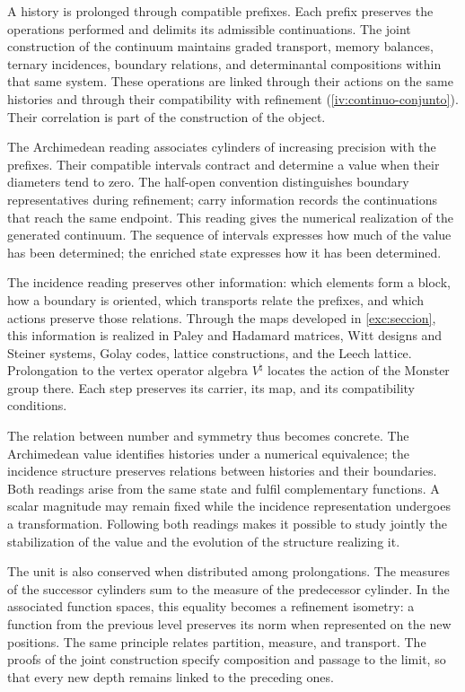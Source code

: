 A history is prolonged through compatible prefixes. Each prefix
preserves the operations performed and delimits its admissible
continuations. The joint construction of the continuum maintains graded
transport, memory balances, ternary incidences, boundary relations,
and determinantal compositions within that same system.
These operations are linked through their actions on
the same histories and through their compatibility with refinement
(\cref{iv:continuo-conjunto}). Their correlation is part of
the construction of the object.

The Archimedean reading associates cylinders of increasing precision
with the prefixes. Their compatible intervals contract and determine a value
when their diameters tend to zero. The half-open convention distinguishes
boundary representatives during refinement; carry
information records the continuations that reach the same endpoint.
This reading gives the numerical realization of the generated continuum.
The sequence of intervals expresses how much of the value has been determined;
the enriched state expresses how it has been determined.

The incidence reading preserves other information: which elements form
a block, how a boundary is oriented, which transports relate the
prefixes, and which actions preserve those relations. Through the maps
developed in \cref{exc:seccion}, this information is realized in
Paley and Hadamard matrices, Witt designs and Steiner systems,
Golay codes, lattice constructions, and the Leech lattice.
Prolongation to the vertex operator algebra \(V^\natural\)
locates the action of the Monster group there. Each step preserves its carrier,
its map, and its compatibility conditions.

The relation between number and symmetry thus becomes concrete. The
Archimedean value identifies histories under a numerical equivalence; the
incidence structure preserves relations between histories and their boundaries.
Both readings arise from the same state and fulfil complementary
functions. A scalar magnitude may remain fixed while
the incidence representation undergoes a transformation. Following
both readings makes it possible to study jointly the stabilization of
the value and the evolution of the structure realizing it.

The unit is also conserved when distributed among prolongations.
The measures of the successor cylinders sum to the measure of the predecessor cylinder.
In the associated function spaces, this equality becomes
a refinement isometry: a function from the previous level preserves
its norm when represented on the new positions. The same
principle relates partition, measure, and transport. The proofs
of the joint construction specify composition and passage to the
limit, so that every new depth remains linked to the
preceding ones.

